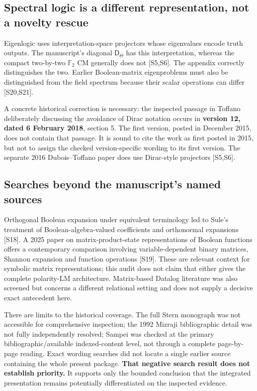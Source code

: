 \documentclass[
  10pt,
]{article}
\begin{document}
\subsection{Spectral logic is a different representation, not a novelty
rescue}\label{spectral-logic-is-a-different-representation-not-a-novelty-rescue}

Eigenlogic uses interpretation-space projectors whose eigenvalues encode
truth outputs. The manuscript's diagonal \(\mathsf D_\Theta\) has this
interpretation, whereas the compact two-by-two \(\mathbb F_2\) CM
generally does not {[}S5,S6{]}. The appendix correctly distinguishes the
two. Earlier Boolean-matrix eigenproblems must also be distinguished
from the field spectrum because their scalar operations can differ
{[}S20,S21{]}.

A concrete historical correction is necessary: the inspected passage in
Toffano deliberately discussing the avoidance of Dirac notation occurs
in \textbf{version 12, dated 6 February 2018}, section 5. The first
version, posted in December 2015, does not contain that passage. It is
sound to cite the work as first posted in 2015, but not to assign the
checked version-specific wording to its first version. The separate 2016
Dubois--Toffano paper does use Dirac-style projectors {[}S5,S6{]}.

\subsection{Searches beyond the manuscript's named
sources}\label{searches-beyond-the-manuscripts-named-sources}

Orthogonal Boolean expansion under equivalent terminology led to Sule's
treatment of Boolean-algebra-valued coefficients and orthonormal
expansions {[}S18{]}. A 2025 paper on matrix-product-state
representations of Boolean functions offers a contemporary comparison
involving variable-dependent binary matrices, Shannon expansion and
function operations {[}S19{]}. These are relevant context for symbolic
matrix representations; this audit does not claim that either gives the
complete polarity-LM architecture. Matrix-based Datalog literature was
also screened but concerns a different relational setting and does not
supply a decisive exact antecedent here.

There are limits to the historical coverage. The full Stern monograph
was not accessible for comprehensive inspection; the 1992 Mizraji
bibliographic detail was not fully independently resolved; Sampei was
checked at the primary bibliographic/available indexed-content level,
not through a complete page-by-page reading. Exact wording searches did
not locate a single earlier source containing the whole present package.
\textbf{That negative search result does not establish priority.} It
supports only the bounded conclusion that the integrated presentation
remains potentially differentiated on the inspected evidence.
\end{document}
